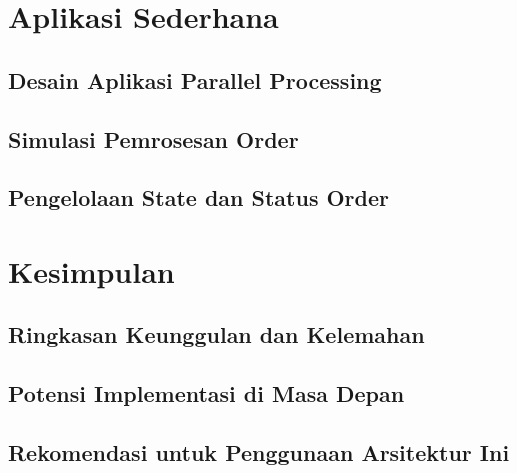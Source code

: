 \section{Aplikasi Sederhana}
\subsection{Desain Aplikasi Parallel Processing}
\subsection{Simulasi Pemrosesan Order}
\subsection{Pengelolaan State dan Status Order}

\section{Kesimpulan}
\subsection{Ringkasan Keunggulan dan Kelemahan}
\subsection{Potensi Implementasi di Masa Depan}
\subsection{Rekomendasi untuk Penggunaan Arsitektur Ini}
